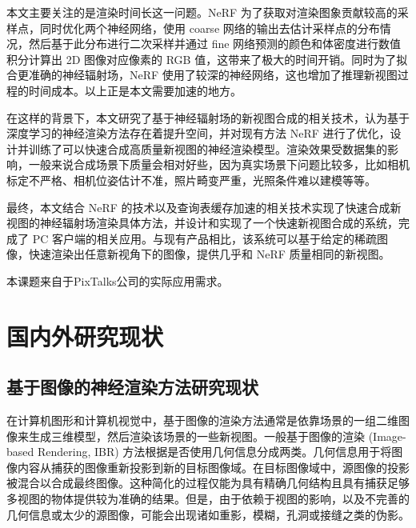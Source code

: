 本文主要关注的是渲染时间长这一问题。NeRF 为了获取对渲染图象贡献较高的采样点，同时优化两个神经网络，使用 coarse 网络的输出去估计采样点的分布情况，然后基于此分布进行二次采样并通过 fine 网络预测的颜色和体密度进行数值积分计算出 2D 图像对应像素的 RGB 值，这带来了极大的时间开销。同时为了拟合更准确的神经辐射场，NeRF 使用了较深的神经网络，这也增加了推理新视图过程的时间成本。以上正是本文需要加速的地方。

在这样的背景下，本文研究了基于神经辐射场的新视图合成的相关技术，认为基于深度学习的神经渲染方法存在着提升空间，并对现有方法 NeRF 进行了优化，设计并训练了可以快速合成高质量新视图的神经渲染模型。渲染效果受数据集的影响，一般来说合成场景下质量会相对好些，因为真实场景下问题比较多，比如相机标定不严格、相机位姿估计不准，照片畸变严重，光照条件难以建模等等。

最终，本文结合 NeRF 的技术以及查询表缓存加速的相关技术实现了快速合成新视图的神经辐射场渲染具体方法，并设计和实现了一个快速新视图合成的系统，完成了 PC 客户端的相关应用。与现有产品相比，该系统可以基于给定的稀疏图像，快速渲染出任意新视角下的图像，提供几乎和 NeRF 质量相同的新视图。

本课题来自于PixTalks公司的实际应用需求。

\section{国内外研究现状}

\subsection{基于图像的神经渲染方法研究现状}
在计算机图形和计算机视觉中，基于图像的渲染方法通常是依靠场景的一组二维图像来生成三维模型，然后渲染该场景的一些新视图。一般基于图像的渲染 (Image-based Rendering, IBR) 方法根据是否使用几何信息分成两类。几何信息用于将图像内容从捕获的图像重新投影到新的目标图像域。在目标图像域中，源图像的投影被混合以合成最终图像。这种简化的过程仅能为具有精确几何结构且具有捕获足够多视图的物体提供较为准确的结果。但是，由于依赖于视图的影响，以及不完善的几何信息或太少的源图像，可能会出现诸如重影，模糊，孔洞或接缝之类的伪影。

